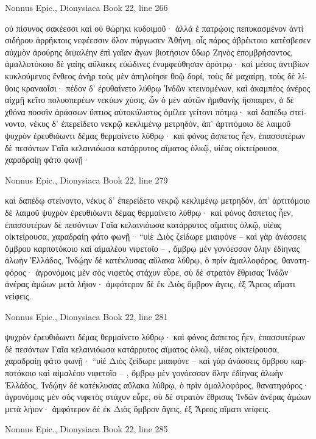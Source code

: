 \documentclass[12pt,letterpaper,twoside,final]{memoir}
\begin{document}
\begin{greek}
Nonnus Epic., Dionysiaca 
Book 22, line 266

οὐ πίσυνος σακέεσσι καὶ οὐ θώρηκι κυδοιμοῦ· 
ἀλλά ἑ πατρῴοις πεπυκασμένον ἀντὶ σιδήρου 
ἀρρήκτοις νεφέεσσιν ὅλον πύργωσεν Ἀθήνη, 
οἷς πάρος ἀβρέκτοιο κατέσβεσεν αὐχμὸν ἀρούρης 
διψαλέην ἐπὶ γαῖαν ἄγων βιοτήσιον ὕδωρ   
Ζηνὸς ἐπομβρήσαντος, ἀμαλλοτόκοιο δὲ γαίης 
αὔλακες εὐώδινες ἐνυμφεύθησαν ἀρότρῳ· 
καὶ μέσος ἀντιβίων κυκλούμενος ἔνθεος ἀνὴρ 
τοὺς μὲν ἀπηλοίησε θοῷ δορί, τοὺς δὲ μαχαίρῃ, 
τοὺς δὲ λίθοις κραναοῖσι· πέδον δ' ἐρυθαίνετο λύθρῳ 
Ἰνδῶν κτεινομένων, καὶ ἀκαμπέος ἀνέρος αἰχμῇ 
κεῖτο πολυσπερέων νεκύων χύσις, ὧν ὁ μὲν αὐτῶν 
ἡμιθανὴς ἤσπαιρεν, ὁ δὲ χθόνα ποσσὶν ἀράσσων 
ὕπτιος αὐτοκύλιστος ὁμίλεε γείτονι πότμῳ· 
καὶ δαπέδῳ στείνοντο, νέκυς δ' ἐπερείδετο νεκρῷ 
κεκλιμένῳ μετρηδόν, ἀπ' ἀρτιτόμοιο δὲ λαιμοῦ 
ψυχρὸν ἐρευθιόωντι δέμας θερμαίνετο λύθρῳ· 
καὶ φόνος ἄσπετος ἦεν, ἐπασσυτέρων δὲ πεσόντων 
Γαῖα κελαινιόωσα κατάρρυτος αἵματος ὁλκῷ, 
υἱέας οἰκτείρουσα, χαραδραίῃ φάτο φωνῇ· 




Nonnus Epic., Dionysiaca 
Book 22, line 279

καὶ δαπέδῳ στείνοντο, νέκυς δ' ἐπερείδετο νεκρῷ 
κεκλιμένῳ μετρηδόν, ἀπ' ἀρτιτόμοιο δὲ λαιμοῦ 
ψυχρὸν ἐρευθιόωντι δέμας θερμαίνετο λύθρῳ· 
καὶ φόνος ἄσπετος ἦεν, ἐπασσυτέρων δὲ πεσόντων 
Γαῖα κελαινιόωσα κατάρρυτος αἵματος ὁλκῷ, 
υἱέας οἰκτείρουσα, χαραδραίῃ φάτο φωνῇ· 
 “υἱὲ Διὸς ζείδωρε μιαιφόνε – καὶ γὰρ ἀνάσσεις 
ὄμβρου καρποτόκοιο καὶ αἱμαλέου νιφετοῖο – , 
ὄμβρῳ μὲν γονόεσσαν ὅλην ἐδίηνας ἀλωὴν 
Ἑλλάδος, Ἰνδῴην δὲ κατέκλυσας αὔλακα λύθρῳ, 
ὁ πρὶν ἀμαλλοφόρος, θανατηφόρος· ἀγρονόμοις μὲν 
σὸς νιφετὸς στάχυν εὗρε, σὺ δὲ στρατὸν ἔθρισας Ἰνδῶν 
ἀνέρας ἀμώων μετὰ λήιον· ἀμφότερον δὲ 
ἐκ Διὸς ὄμβρον ἄγεις, ἐξ Ἄρεος αἵματι νείφεις. 



Nonnus Epic., Dionysiaca 
Book 22, line 281

ψυχρὸν ἐρευθιόωντι δέμας θερμαίνετο λύθρῳ· 
καὶ φόνος ἄσπετος ἦεν, ἐπασσυτέρων δὲ πεσόντων 
Γαῖα κελαινιόωσα κατάρρυτος αἵματος ὁλκῷ, 
υἱέας οἰκτείρουσα, χαραδραίῃ φάτο φωνῇ· 
 “υἱὲ Διὸς ζείδωρε μιαιφόνε – καὶ γὰρ ἀνάσσεις 
ὄμβρου καρποτόκοιο καὶ αἱμαλέου νιφετοῖο – , 
ὄμβρῳ μὲν γονόεσσαν ὅλην ἐδίηνας ἀλωὴν 
Ἑλλάδος, Ἰνδῴην δὲ κατέκλυσας αὔλακα λύθρῳ, 
ὁ πρὶν ἀμαλλοφόρος, θανατηφόρος· ἀγρονόμοις μὲν 
σὸς νιφετὸς στάχυν εὗρε, σὺ δὲ στρατὸν ἔθρισας Ἰνδῶν 
ἀνέρας ἀμώων μετὰ λήιον· ἀμφότερον δὲ 
ἐκ Διὸς ὄμβρον ἄγεις, ἐξ Ἄρεος αἵματι νείφεις. 



Nonnus Epic., Dionysiaca 
Book 22, line 285


\end{greek}
\end{document}
